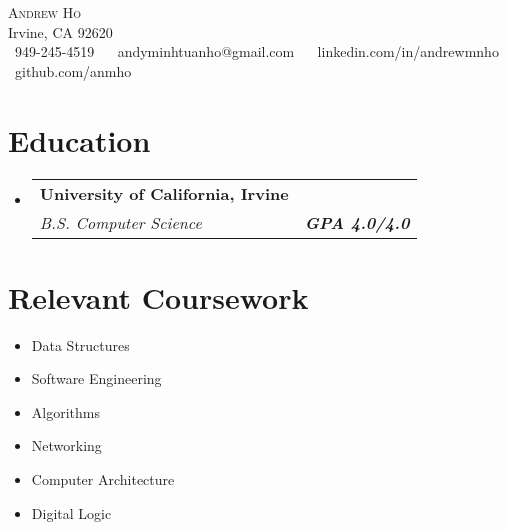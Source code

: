 \documentclass[letterpaper,11pt]{article}
\makeatletter
\newcommand{\resumeSubheading}[4]{
  \vspace{-2pt}\item
    \begin{tabular*}{1.0\textwidth}[t]{l@{\extracolsep{\fill}}r}
      \textbf{#1} & \textbf{\small #2} \\
      \textit{\small#3} & \textit{\small #4} \\
    \end{tabular*}\vspace{-7pt}
}
\newcommand{\resumeSubHeadingListStart}{\begin{itemize}[leftmargin=0.0in, label={}]}
\newcommand{\resumeSubHeadingListEnd}{\end{itemize}}
\makeatother
\begin{document}

\begin{center}
    {\Huge \scshape Andrew Ho} \\ \vspace{1pt}
    Irvine, CA 92620 \\ \vspace{1pt}
    \small \raisebox{-0.1\height}\faPhone\ 949-245-4519 ~ 
    \raisebox{-0.2\height}\faEnvelope\  {andyminhtuanho@gmail.com} ~
    \raisebox{-0.2\height}\faLinkedin\ {linkedin.com/in/andrewmnho}  ~
    \raisebox{-0.2\height}\faGithub\ {github.com/anmho}
    \vspace{-8pt}
\end{center}


\section{Education}
\resumeSubHeadingListStart
\resumeSubheading
{University of California, Irvine \normalfont{\small{}}}
{\normalfont{June 2024}}
{B.S. Computer Science} {\textbf{GPA 4.0/4.0}}
\resumeSubHeadingListEnd

\section{Relevant Coursework}
\begin{multicols}{4}
    \begin{itemize}[itemsep=-5pt, parsep=3pt]
        \item\small Data Structures
        \item Software Engineering
        \item Algorithms
        \item Networking
        \item Computer Architecture
        \item Digital Logic
    \end{itemize}
\end{multicols}
\vspace*{2.0\multicolsep}
\end{document}
